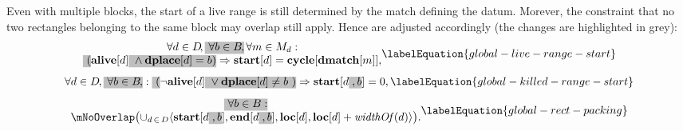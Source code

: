 Even with multiple \glspl{block}, the start of a \gls{live range} is still
determined by the \gls{match} defining the \gls{datum}.
%
Morever, the \gls{constraint} that no two rectangles belonging to the same
\gls{block} may overlap still apply.
%
Hence  are adjusted accordingly (the changes are highlighted in
grey):
%
\begin{equation}
  \begin{array}{@{}c@{}}
    \forall d \in \mDataSet \!,
    \hlDiff{\forall b \in \mBlockSet \hspace{-1pt},} \,
    \forall m \in \mMatchSet[d] : \\
    \hlDiff{(}
      \mVar{alive}[d]
      \hlDiff{
        \mbox{}
        \mAnd
        \mVar{dplace}[d] = b
    )}
    \mImp
    \mVar{start}[d] = \mVar{cycle}[\mVar{dmatch}[m]],
  \end{array}
  \labelEquation{global-live-range-start}
\end{equation}
%
\begin{equation}
  \forall d \in \mDataSet \hspace{-1pt},
  \hlDiff{\forall b \in \mBlockSet \hspace{-1pt},} :
  \hlDiff{(}
    \neg\mVar{alive}[d]
    \hlDiff{
      \mbox{}
      \mOr
      \mVar{dplace}[d] \neq b
    }
  \hlDiff{)}
  \mImp
  \mVar{start}[d \hlDiff{\hspace{-.4pt}, b}] = 0,
  \labelEquation{global-killed-range-start}
\end{equation}
%
\begin{equation}
  \begin{array}{@{}c@{}}
    \hlDiff{\forall b \in \mBlockSet :} \\
    \mNoOverlap\!
    \left(
      \cup_{d \,\in\, \mDataSet}
        \mTuple{
           \mVar{start}[d \hlDiff{\hspace{-.4pt}, b}],
           \mVar{end}[d \hlDiff{\hspace{-.4pt}, b}],
           \mVar{loc}[d],
           \mVar{loc}[d] + \mWidthOf(d)
        }
    \right)\!.
  \end{array}
  \labelEquation{global-rect-packing}
\end{equation}

